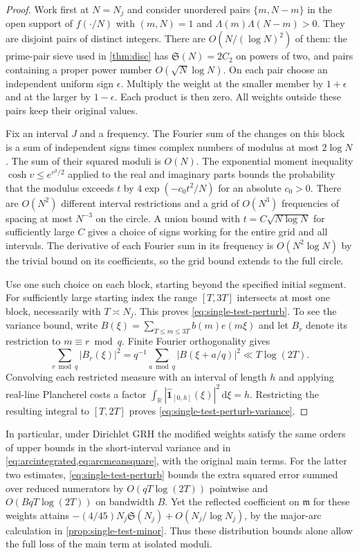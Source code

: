 \documentclass[11pt,a4paper]{article}
\numberwithin{equation}{section}
\newcommand{\SSS}{\mathfrak S}
\newcommand{\ud}{\mathrm d}
\begin{document}
\begin{proof}
Work first at $N=N_j$ and consider unordered pairs $\{m,N-m\}$
in the open support of $f(\cdot/N)$ with $(m,N)=1$ and
$\Lambda(m)\Lambda(N-m)>0$. They are disjoint pairs of distinct
integers. There are $O(N/(\log N)^2)$ of them: the prime-pair
sieve used in \cref{thm:disc} has $\SSS(N)=2C_2$ on powers of
two, and pairs containing a proper power number
$O(\sqrt N\log N)$. On each pair choose an independent uniform
sign $\epsilon$. Multiply the weight at the smaller member by
$1+\epsilon$ and at the larger by $1-\epsilon$. Each product is
then zero. All weights outside these pairs keep their original
values.

Fix an interval $J$ and a frequency. The Fourier sum of the
changes on this block is a sum of independent signs times
complex numbers of modulus at most $2\log N$. The sum of their
squared moduli is $O(N)$. The exponential moment inequality
$\cosh v\le e^{v^2/2}$ applied to the real and imaginary parts
bounds the probability that the modulus exceeds $t$ by
$4\exp(-c_0t^2/N)$ for an absolute $c_0>0$. There are $O(N^2)$
different interval restrictions and a grid of $O(N^3)$ frequencies
of spacing at most $N^{-3}$ on the circle. A union bound with
$t=C\sqrt{N\log N}$ for sufficiently large $C$ gives a choice
of signs working for the entire grid and all intervals. The
derivative of each Fourier sum in its frequency is $O(N^2\log N)$
by the trivial bound on its coefficients, so the grid bound
extends to the full circle.

Use one such choice on each block, starting beyond the specified
initial segment. For sufficiently large starting index the range
$[T,3T]$ intersects at most one block, necessarily with $T\asymp N_j$.
This proves \cref{eq:single-test-perturb}. To see the variance
bound, write $B(\xi)=\sum_{T\le m\le3T}b(m)e(m\xi)$ and let
$B_r$ denote its restriction to $m\equiv r\bmod q$. Finite
Fourier orthogonality gives
\[
  \sum_{r\bmod q}|B_r(\xi)|^2
     =q^{-1}\sum_{a\bmod q}|B(\xi+a/q)|^2\ll T\log(2T).
\]
Convolving each restricted measure with an interval of length $h$
and applying real-line Plancherel costs a factor
$\int_{\mathbb R}|\widehat{\mathbf1}_{[0,h]}(\xi)|^2\,\ud\xi=h$.
Restricting the resulting integral to $[T,2T]$ proves
\cref{eq:single-test-perturb-variance}.
\end{proof}

In particular, under Dirichlet GRH the modified weights satisfy
the same orders of upper bounds in the short-interval variance
and in \cref{eq:arcintegrated,eq:arcmeansquare}, with the original
main terms. For the latter two estimates, \cref{eq:single-test-perturb}
bounds the extra squared error summed over reduced numerators by
$O(qT\log(2T))$ pointwise and $O(BqT\log(2T))$ on bandwidth $B$.
Yet the reflected coefficient on $\mathfrak m$ for these weights
attains $-(4/45)N_j\SSS(N_j)+O(N_j/\log N_j)$, by the major-arc
calculation in \cref{prop:single-test-minor}. Thus these distribution
bounds alone allow the full loss of the main term at isolated moduli.
\end{document}

